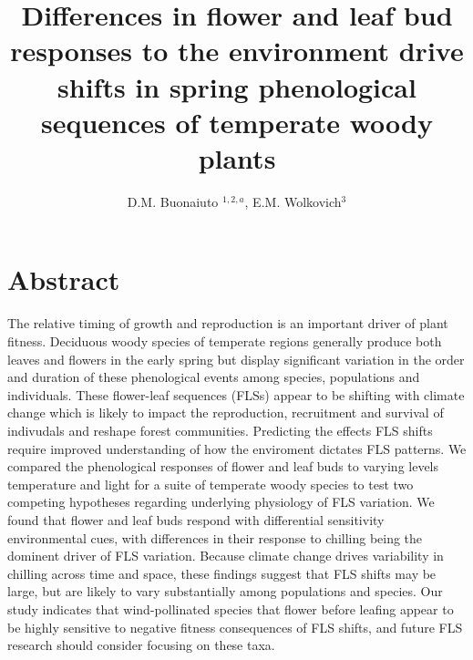 \documentclass[11pt]{article}\usepackage[]{graphicx}\usepackage[]{color}
\title{Differences in flower and leaf bud responses to the environment drive shifts in spring phenological sequences of temperate woody plants}\\
\date{}
\author{D.M. Buonaiuto $^{1,2,a}$, E.M. Wolkovich$^{3}$}
\makeatletter
\newenvironment{kframe}{%
 \def\at@end@of@kframe{}%
 \ifinner\ifhmode%
  \def\at@end@of@kframe{\end{minipage}}%
  \begin{minipage}{\columnwidth}%
 \fi\fi%
 \def\FrameCommand##1{\hskip\@totalleftmargin \hskip-\fboxsep
 \colorbox{shadecolor}{##1}\hskip-\fboxsep
     \hskip-\linewidth \hskip-\@totalleftmargin \hskip\columnwidth}%
 \MakeFramed {\advance\hsize-\width
   \@totalleftmargin\z@ \linewidth\hsize
   \@setminipage}}%
 {\par\unskip\endMakeFramed%
 \at@end@of@kframe}
\makeatother
\begin{document}
\begin{kframe}


{\ttfamily\noindent\itshape\color{messagecolor}{\#\# Registered S3 method overwritten by 'xts':\\\#\#\ \  method\ \ \ \  from\\\#\#\ \  as.zoo.xts zoo}}

{\ttfamily\noindent\itshape\color{messagecolor}{\#\# Loading 'brms' package (version 2.11.1). Useful instructions\\\#\# can be found by typing help('brms'). A more detailed introduction\\\#\# to the package is available through vignette('brms\_overview').}}\end{kframe}

\section*{Abstract} 
The relative timing of growth and reproduction is an important driver of plant fitness. Deciduous woody species of temperate regions generally produce both leaves and flowers in the early spring but display significant variation in the order and duration of these phenological events among species, populations and individuals.   These flower-leaf sequences (FLSs) appear to be shifting with climate change which is likely to impact the reproduction, recruitment and survival of indivudals and reshape forest communities. Predicting the effects FLS shifts require improved understanding of how the enviroment dictates FLS patterns. We compared the phenological responses of flower and leaf buds to varying levels temperature and light for a suite of temperate woody species to test two competing hypotheses regarding underlying physiology of FLS variation. We found that flower and leaf buds respond with differential sensitivity environmental cues, with differences in their response to chilling being the dominent driver of FLS variation. Because climate change drives variability in chilling across time and space, these findings suggest that FLS shifts may be large, but are likely to vary substantially among populations and species. Our study indicates that wind-pollinated species that flower before leafing appear to be highly sensitive to negative fitness consequences of FLS shifts, and future FLS research should consider focusing on these taxa.  %
\end{document}
